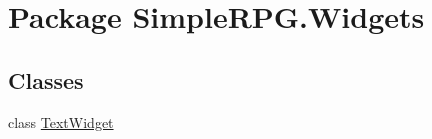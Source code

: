 \hypertarget{namespace_simple_r_p_g_1_1_widgets}{\section{Package Simple\+R\+P\+G.\+Widgets}
\label{namespace_simple_r_p_g_1_1_widgets}
}
\subsection*{Classes}
\begin{DoxyCompactItemize}
\item 
class \hyperlink{class_simple_r_p_g_1_1_widgets_1_1_text_widget}{Text\+Widget}
\end{DoxyCompactItemize}
